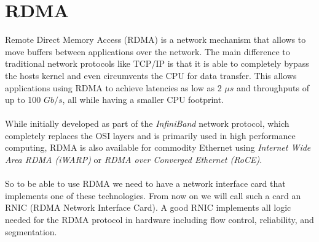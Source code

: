 \section{RDMA} \label{sec:rdma}

Remote Direct Memory Access (RDMA) is a network mechanism that allows to move buffers between applications over the network.
The main difference to traditional network protocols like TCP/IP is that it is able to completely bypass the hosts kernel
and even circumvents the CPU for data transfer. This allows applications using RDMA to achieve latencies as low as 2 $\mu s$
and throughputs of up to 100 $Gb/s$, all while having a smaller CPU footprint.


\paragraph{} While initially developed as part of the \emph{InfiniBand} network protocol, which completely replaces the OSI 
layers and is primarily used in high performance computing, RDMA is also available for commodity Ethernet using 
\emph{Internet Wide Area RDMA (iWARP)} or \emph{RDMA over Converged Ethernet (RoCE)}.


\paragraph{} So to be able to use RDMA we need to have a network interface card that implements one of these technologies. 
From now on we will call such a card an RNIC (RDMA Network Interface Card). A good RNIC implements all logic needed for 
the RDMA protocol in hardware including flow control, reliability, and segmentation.


